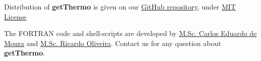 \documentclass[11pt,oneside,a4paper]{article}
\begin{document}
Distribution of \textbf{getThermo} is given on our \href{https://github.com/carlosevmoura/getThermo}{GitHub repository}, under \href{https://opensource.org/licenses/MIT}{MIT License}

The FORTRAN code and shell-scripts are developed by \href{mailto:carlosevmoura@iq.ufrj.br}{M.Sc. Carlos Eduardo de Moura} and \href{mailto:rrjunior@iq.ufrj.br}{M.Sc. Ricardo Oliveira}. Contact us for any question about \textbf{getThermo}.

\pagebreak


\end{document}
